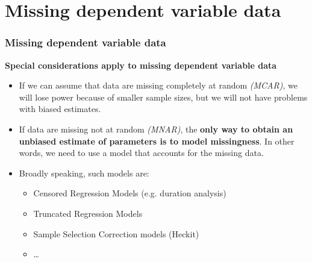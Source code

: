 \documentclass{beamer}
\begin{document}
\section{Missing dependent variable data}
\begin{frame}
\frametitle{Missing dependent variable data}

\textbf{Special considerations apply to missing dependent variable data}

\begin{itemize}
  \item If we can assume that data are missing completely at random \textit{(MCAR)}, we will lose power because of smaller sample sizes, but we will not have problems with biased estimates.
  \item If data are missing not at random \textit{(MNAR)}, the \textbf{only way to obtain an unbiased estimate of parameters is to model missingness}. In other words, we need to use a model that accounts for the missing data.
  \item Broadly speaking, such models are:
  \begin{itemize}
    \item Censored Regression Models (e.g. duration analysis) 
    \item Truncated Regression Models 
    \item Sample Selection Correction models (Heckit)
    \item \dots
  \end{itemize}
\end{itemize}

\end{frame}
\end{document}
